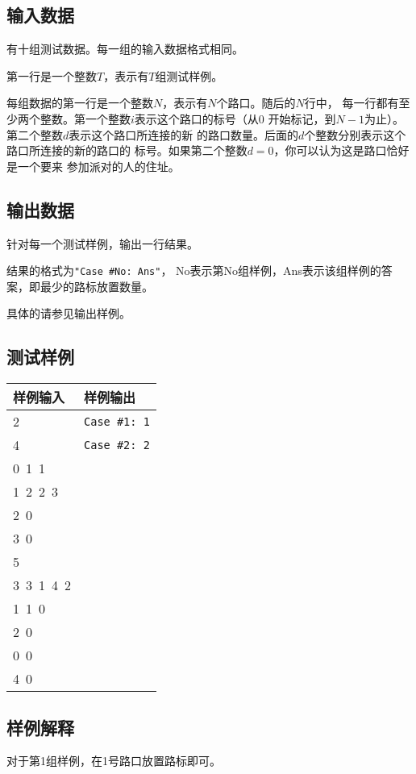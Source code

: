 \documentclass{article}
\begin{document}
\subsection*{输入数据}
有十组测试数据。每一组的输入数据格式相同。

第一行是一个整数$T$，表示有$T$组测试样例。

每组数据的第一行是一个整数$N$，表示有$N$个路口。随后的$N$行中，
每一行都有至少两个整数。第一个整数$i$表示这个路口的标号（从0
开始标记，到$N - 1$为止）。第二个整数$d$表示这个路口所连接的新
的路口数量。后面的$d$个整数分别表示这个路口所连接的新的路口的
标号。如果第二个整数$d = 0$，你可以认为这是路口恰好是一个要来
参加派对的人的住址。

\subsection*{输出数据}
针对每一个测试样例，输出一行结果。

结果的格式为{\tt "Case \#No: Ans"}，
No表示第No组样例，Ans表示该组样例的答案，即最少的路标放置数量。

具体的请参见输出样例。

\subsection*{测试样例}
\begin{flushleft}
\begin{tabular}{|p{6cm}|p{6cm}|}
 \hline \bfseries{样例输入} & \bfseries{样例输出} \\
 \hline 
    2 & {\tt Case \#1: 1} \\
    4 & {\tt Case \#2: 2} \\
    0\ 1\ 1 & \\
    1\ 2\ 2\ 3 & \\
    2\ 0 & \\
    3\ 0 & \\
    5 & \\
    3\ 3\ 1\ 4\ 2 & \\
    1\ 1\ 0 & \\
    2\ 0 & \\
    0\ 0 & \\
    4\ 0 & \\
 \hline 
\end{tabular}
\end{flushleft}

\subsection*{样例解释}
对于第1组样例，在1号路口放置路标即可。
\end{document}
